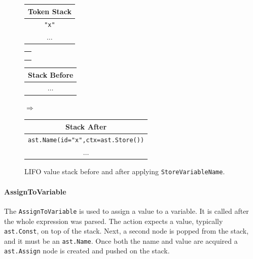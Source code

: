 \begin{figure}[H]\label{fig:storeVariableName-stack}
  \centering
  {\small

  \begin{tabular}{|c|}
    \hline
    \textbf{Token Stack} \\ \hline
    \texttt{"x"}       \\ \hline
    \(\dots\)            \\ \hline
  \end{tabular}
  \begin{tabular}{|c}
    \\
    \\
    \\
    \\
  \end{tabular}
  \begin{tabular}{|c|}
    \hline
    \textbf{Stack Before} \\ \hline
    \(\dots\)             \\ \hline
  \end{tabular}
  \hspace{0.25em}$\Longrightarrow$\hspace{0.25em}
  \begin{tabular}{|c|}
    \hline
    \textbf{Stack After} \\ \hline
    \texttt{\tiny{ast.}}\texttt{Name(id="x",ctx=}\texttt{\tiny{ast.}}\texttt{Store())} \\ \hline
    \(\dots\)                       \\ \hline
  \end{tabular}
  }
  \caption{LIFO value stack before and after applying \texttt{StoreVariableName}.}
  
\end{figure}

\paragraph{AssignToVariable}
The \texttt{AssignToVariable} is used to assign a value to a variable. It is called after the whole expression was parsed. The action expects a value, typically \texttt{ast.Const}, on top of the stack. Next, a second node is popped from the stack, and it must be an \texttt{ast.Name}. Once both the name and value are acquired a \texttt{ast.Assign} node is created and pushed on the stack.

